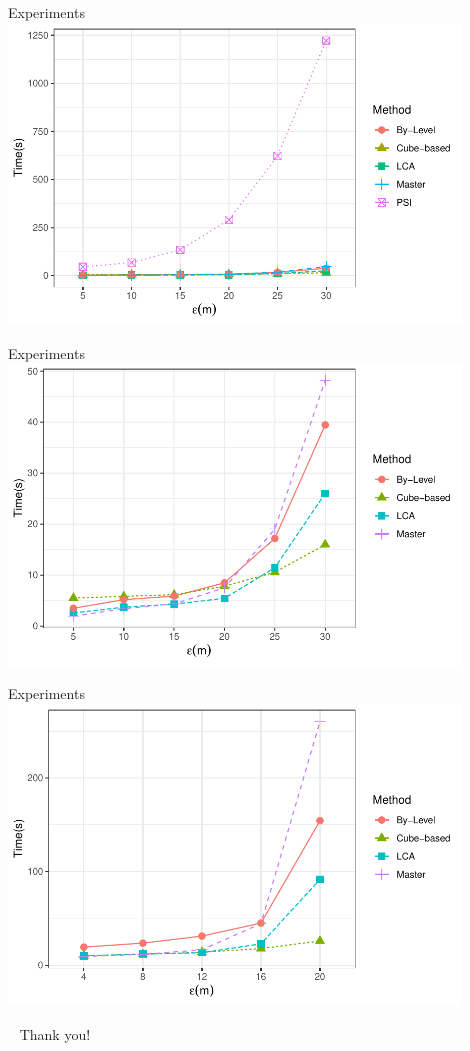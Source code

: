 \documentclass{beamer}
\begin{document}
    \begin{frame}{Experiments}
        \centering
        \includegraphics[width=0.9\textwidth]
                {../thesis/chapter4/figures/plots/08_sequential_parallel/la25k_e_bfe_psi}
    \end{frame}

    \begin{frame}{Experiments}
        \centering
        \includegraphics[width=0.9\textwidth]
                {../thesis/chapter4/figures/plots/08_sequential_parallel/la25k_e}
    \end{frame}

    \begin{frame}{Experiments}
        \centering
        \includegraphics[width=0.9\textwidth]
                {../thesis/chapter4/figures/plots/08_sequential_parallel/la50k_e}
    \end{frame}

    \begin{frame}{ \ }
        \LARGE Thank you!
    \end{frame}
\end{document}
